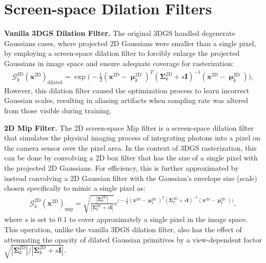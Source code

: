 \section{Screen-space Dilation Filters}
\textbf{Vanilla 3DGS Dilation Filter.} The original 3DGS \cite{kerbl20233d} handled degenerate Gaussians cases, where projected 2D Gaussians were smaller than a single pixel, by employing a screen-space dilation filter to forcibly enlarge the projected Gaussians in image space and ensure adequate coverage for rasterization:
\begin{equation}
   \begin{split}
   \mathcal{G}_k^\text{2D}(\mathbf{x}^\text{2D})_\text{dilated} = \exp{\bigg(-\frac{1}{2}(\mathbf{x}^\text{2D}-\bm{\upmu}_k^\text{2D})^T(\mathbf{\Sigma}_k^\text{2D}+s\mathbf{I})^{-1}(\mathbf{x}^\text{2D}-\bm{\upmu}_k^\text{2D})\bigg)},
   \end{split}
   \label{eq:2d_dilation_filter}
\end{equation}
However, this dilation filter caused the optimization process to learn incorrect Gaussian scales, resulting in aliasing artifacts when sampling rate was altered from those visible during training.

\noindent \textbf{2D Mip Filter.} The 2D screen-space Mip filter \cite{yu2024mip} is a screen-space dilation filter that simulates the physical imaging process of integrating photons into a pixel on the camera sensor over the pixel area. In the context of 3DGS rasterization, this can be done by convolving a 2D box filter that has the size of a single pixel with the projected 2D Gaussians. For efficiency, this is further approximated by instead convolving a 2D Gaussian filter with the Gaussian's envelope size (scale) chosen specifically to mimic a single pixel as:
\begin{equation}
   \begin{split}
   \mathcal{G}_k^\text{2D}(\mathbf{x}^\text{2D})_\text{mip} = \sqrt{\frac{|\mathbf{\Sigma}_k^\text{2D}|}{|\mathbf{\Sigma}_k^\text{2D}+s\mathbf{I}|}}e^{\big(-\frac{1}{2}(\mathbf{x}^\text{2D}-\bm{\upmu}_k^\text{2D})^T(\mathbf{\Sigma}_k^\text{2D}+s\mathbf{I})^{-1}(\mathbf{x}^\text{2D}-\bm{\upmu}_k^\text{2D})\big)},
   \end{split}
   \label{eq:2d_mip_filter}
\end{equation}
where $s$ is set to $0.1$ to cover approximately a single pixel in the image space. This operation, unlike the vanilla 3DGS dilation filter, also has the effect of attenuating the opacity of dilated Gaussian primitives by a view-dependent factor $\sqrt{|\mathbf{\Sigma}_k^\text{2D}|/|\mathbf{\Sigma}_k^\text{2D}+s\mathbf{I}|}$.

